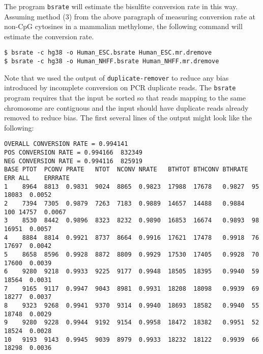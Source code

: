 \documentclass[10pt]{article}
\newcommand{\prog}[1]{\texttt{#1}}
\begin{document}
The program \prog{bsrate} will estimate the bisulfite conversion rate
in this way. Assuming method (3) from the above paragraph of measuring
conversion rate at non-CpG cytosines in a mammalian methylome, the
following command will estimate the conversion rate.
\begin{verbatim}
$ bsrate -c hg38 -o Human_ESC.bsrate Human_ESC.mr.dremove
$ bsrate -c hg38 -o Human_NHFF.bsrate Human_NHFF.mr.dremove
\end{verbatim}
Note that we used the output of \prog{duplicate-remover} to reduce any
bias introduced by incomplete conversion on PCR duplicate reads. The
\prog{bsrate} program requires that the input be sorted so that
reads mapping to the same chromosome are contiguous and the input should
have duplicate reads already removed to reduce bias. The first several
lines of the output might look like the following:
{\small{%
\begin{verbatim}
OVERALL CONVERSION RATE = 0.994141
POS CONVERSION RATE = 0.994166  832349
NEG CONVERSION RATE = 0.994116  825919
BASE PTOT  PCONV PRATE   NTOT  NCONV NRATE   BTHTOT BTHCONV BTHRATE ERR ALL    ERRRATE
1    8964  8813  0.9831  9024  8865  0.9823  17988  17678   0.9827  95  18083  0.0052
2    7394  7305  0.9879  7263  7183  0.9889  14657  14488   0.9884  100 14757  0.0067
3    8530  8442  0.9896  8323  8232  0.9890  16853  16674   0.9893  98  16951  0.0057
4    8884  8814  0.9921  8737  8664  0.9916  17621  17478   0.9918  76  17697  0.0042
5    8658  8596  0.9928  8872  8809  0.9929  17530  17405   0.9928  70  17600  0.0039
6    9280  9218  0.9933  9225  9177  0.9948  18505  18395   0.9940  59  18564  0.0031
7    9165  9117  0.9947  9043  8981  0.9931  18208  18098   0.9939  69  18277  0.0037
8    9323  9268  0.9941  9370  9314  0.9940  18693  18582   0.9940  55  18748  0.0029
9    9280  9228  0.9944  9192  9154  0.9958  18472  18382   0.9951  52  18524  0.0028
10   9193  9143  0.9945  9039  8979  0.9933  18232  18122   0.9939  66  18298  0.0036
\end{verbatim}%
}}
\end{document}
